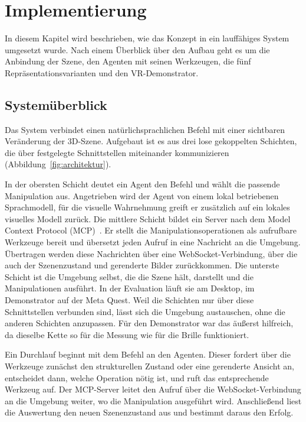 
\chapter{Implementierung}
\label{ch:implementierung}

In diesem Kapitel wird beschrieben, wie das Konzept in ein lauffähiges System umgesetzt wurde.
Nach einem Überblick über den Aufbau geht es um die Anbindung der Szene, den Agenten mit seinen Werkzeugen, die fünf Repräsentationsvarianten und den VR-Demonstrator.


\section{Systemüberblick}
\label{sec:impl-overview}

Das System verbindet einen natürlichsprachlichen Befehl mit einer sichtbaren Veränderung der 3D-Szene.
Aufgebaut ist es aus drei lose gekoppelten Schichten, die über festgelegte Schnittstellen miteinander kommunizieren (Abbildung~\ref{fig:architektur}).

In der obersten Schicht deutet ein Agent den Befehl und wählt die passende Manipulation aus.
Angetrieben wird der Agent von einem lokal betriebenen Sprachmodell, für die visuelle Wahrnehmung greift er zusätzlich auf ein lokales visuelles Modell zurück.
Die mittlere Schicht bildet ein Server nach dem Model Context Protocol (MCP)~\cite{mcp}.
Er stellt die Manipulationsoperationen als aufrufbare Werkzeuge bereit und übersetzt jeden Aufruf in eine Nachricht an die Umgebung.
Übertragen werden diese Nachrichten über eine WebSocket-Verbindung, über die auch der Szenenzustand und gerenderte Bilder zurückkommen.
Die unterste Schicht ist die Umgebung selbst, die die Szene hält, darstellt und die Manipulationen ausführt.
In der Evaluation läuft sie am Desktop, im Demonstrator auf der Meta Quest.
Weil die Schichten nur über diese Schnittstellen verbunden sind, lässt sich die Umgebung austauschen, ohne die anderen Schichten anzupassen.
Für den Demonstrator war das äußerst hilfreich, da dieselbe Kette so für die Messung wie für die Brille funktioniert.

Ein Durchlauf beginnt mit dem Befehl an den Agenten.
Dieser fordert über die Werkzeuge zunächst den strukturellen Zustand oder eine gerenderte Ansicht an, entscheidet dann, welche Operation nötig ist, und ruft das entsprechende Werkzeug auf.
Der MCP-Server leitet den Aufruf über die WebSocket-Verbindung an die Umgebung weiter, wo die Manipulation ausgeführt wird.
Anschließend liest die Auswertung den neuen Szenenzustand aus und bestimmt daraus den Erfolg.

